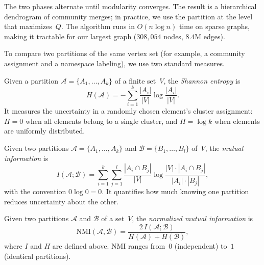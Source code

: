 \noindent
The two phases alternate until modularity converges. The result is a hierarchical dendrogram of community merges; in practice, we use the partition at the level that maximizes~$Q$. The algorithm runs in $O(n \log n)$ time on sparse graphs, making it tractable for our largest graph ($308{,}054$ nodes, $8.4$M edges).

To compare two partitions of the same vertex set (for example, a community assignment and a namespace labeling), we use two standard measures.

\begin{definition}
\label{def:shannon-entropy}
Given a partition $\mathcal{A} = \{A_1, \ldots, A_k\}$ of a finite set~$V$, the \emph{Shannon entropy} is
\[
  H(\mathcal{A}) = -\sum_{i=1}^{k} \frac{|A_i|}{|V|} \log \frac{|A_i|}{|V|}.
\]
It measures the uncertainty in a randomly chosen element's cluster assignment: $H = 0$ when all elements belong to a single cluster, and $H = \log k$ when elements are uniformly distributed.
\end{definition}

\begin{definition}
\label{def:mutual-information}
Given two partitions $\mathcal{A} = \{A_1, \ldots, A_k\}$ and $\mathcal{B} = \{B_1, \ldots, B_l\}$ of~$V$, the \emph{mutual information} is
\[
  I(\mathcal{A}; \mathcal{B}) = \sum_{i=1}^{k} \sum_{j=1}^{l} \frac{|A_i \cap B_j|}{|V|} \log \frac{|V| \cdot |A_i \cap B_j|}{|A_i| \cdot |B_j|},
\]
with the convention $0 \log 0 = 0$. It quantifies how much knowing one partition reduces uncertainty about the other.
\end{definition}

\begin{definition}
\label{def:nmi}
Given two partitions $\mathcal{A}$ and $\mathcal{B}$ of a set~$V$, the \emph{normalized mutual information} is
\[
  \mathrm{NMI}(\mathcal{A}, \mathcal{B}) = \frac{2\, I(\mathcal{A}; \mathcal{B})}{H(\mathcal{A}) + H(\mathcal{B})},
\]
where $I$ and $H$ are defined above. NMI ranges from~$0$ (independent) to~$1$ (identical partitions).
\end{definition}

